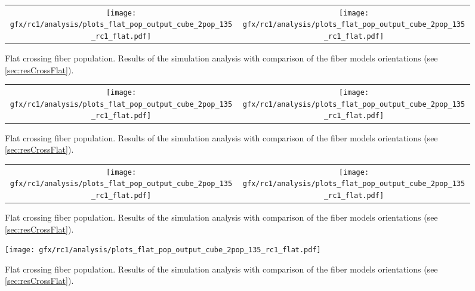 \begin{sidewaysfigure}[!p]
    \centering
    \begin{tabular}{cc}
    \texttt{[image: gfx/rc1/analysis/plots\_flat\_pop\_output\_cube\_2pop\_135\_rc1\_flat.pdf]} &
    \texttt{[image: gfx/rc1/analysis/plots\_flat\_pop\_output\_cube\_2pop\_135\_rc1\_flat.pdf]}
    \end{tabular}
    \caption[]{Flat crossing fiber population. Results of the simulation analysis with comparison of the fiber models orientations (see \cref{sec:resCrossFlat}).}
    \label{app:flat_fiber_pop_b}
\end{sidewaysfigure}
%
\begin{sidewaysfigure}[!p]
    \centering
    \begin{tabular}{cc}
    \texttt{[image: gfx/rc1/analysis/plots\_flat\_pop\_output\_cube\_2pop\_135\_rc1\_flat.pdf]} &
    \texttt{[image: gfx/rc1/analysis/plots\_flat\_pop\_output\_cube\_2pop\_135\_rc1\_flat.pdf]}
    \end{tabular}
    \caption[]{Flat crossing fiber population. Results of the simulation analysis with comparison of the fiber models orientations (see \cref{sec:resCrossFlat}).}
    \label{app:flat_fiber_pop_c}
\end{sidewaysfigure}
%
\begin{sidewaysfigure}[!p]
    \centering
    \begin{tabular}{cc}
    \texttt{[image: gfx/rc1/analysis/plots\_flat\_pop\_output\_cube\_2pop\_135\_rc1\_flat.pdf]} &
    \texttt{[image: gfx/rc1/analysis/plots\_flat\_pop\_output\_cube\_2pop\_135\_rc1\_flat.pdf]}
    \end{tabular}
    \caption[]{Flat crossing fiber population. Results of the simulation analysis with comparison of the fiber models orientations (see \cref{sec:resCrossFlat}).}
    \label{app:flat_fiber_pop_d}
\end{sidewaysfigure}
%
\begin{figure}[!p]
    \centering
    \texttt{[image: gfx/rc1/analysis/plots\_flat\_pop\_output\_cube\_2pop\_135\_rc1\_flat.pdf]}
    \caption[]{Flat crossing fiber population. Results of the simulation analysis with comparison of the fiber models orientations (see \cref{sec:resCrossFlat}).}
    \label{app:flat_fiber_pop_e}
\end{figure}
%
%
